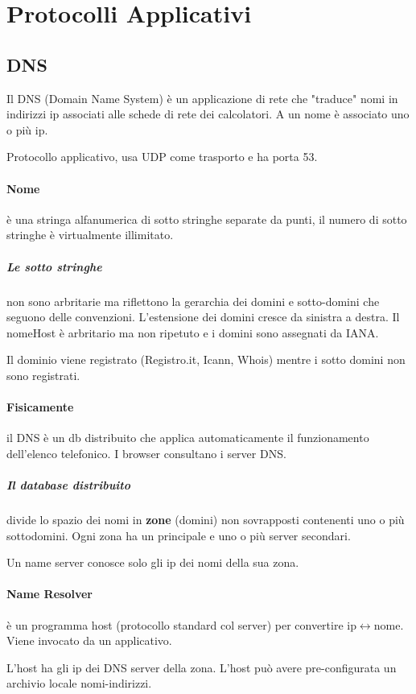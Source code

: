 \section{Protocolli Applicativi}
\subsection{DNS}
Il DNS (Domain Name System) è un applicazione di rete che "traduce" nomi in indirizzi ip associati alle schede di rete dei calcolatori.
A un nome è associato uno o più ip.

Protocollo applicativo, usa UDP come trasporto e ha porta 53.

\paragraph{Nome} è una stringa alfanumerica di sotto stringhe separate da punti, il numero di sotto stringhe è virtualmente illimitato.
\subparagraph{Le sotto stringhe} non sono arbritarie ma riflettono la gerarchia dei domini e sotto-domini che seguono delle convenzioni.
L'estensione dei domini cresce da sinistra a destra. Il nomeHost è arbritario ma non ripetuto e i domini sono assegnati da IANA.

Il dominio viene registrato (Registro.it, Icann, Whois) mentre i sotto domini non sono registrati.

\paragraph{Fisicamente} il DNS è un db distribuito che applica automaticamente il funzionamento dell'elenco telefonico.
I browser consultano i server DNS.
\subparagraph{Il database distribuito} divide lo spazio dei nomi in \textbf{zone} (domini) non sovrapposti contenenti uno o più sottodomini.
Ogni zona ha un \textbf{ } principale e uno o più server secondari.

Un name server conosce solo gli ip dei nomi della sua zona.

\paragraph{Name Resolver} è un programma host (protocollo standard col server) per convertire ip$\leftrightarrow$nome. Viene invocato da un applicativo.

L'host ha gli ip dei DNS server della zona. L'host può avere pre-configurata un archivio locale nomi-indirizzi.


